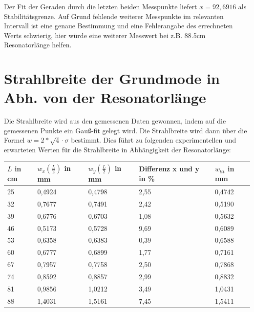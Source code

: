 \documentclass[bigchapter,colorback,accentcolor=tud4b,linedtoc,11pt]{tudreport}
\numberwithin{equation}{subsection}
\begin{document}
Der Fit der Geraden durch die letzten beiden Messpunkte liefert $x=92,6916$ als Stabilitätsgrenze. Auf Grund fehlende weiterer Messpunkte im relevanten Intervall ist eine genaue Bestimmung und eine Fehlerangabe des errechneten Werts schwierig, hier würde eine weiterer Messwert bei z.B. 88.5cm Resonatorlänge helfen.
\section{Strahlbreite der Grundmode in Abh. von der Resonatorlänge}
Die Strahlbreite wird aus den gemessenen Daten gewonnen, indem auf die gemessenen Punkte ein Gauß-fit gelegt wird. Die Strahlbreite wird dann über die Formel
$w=2*\sqrt{4}\cdot\sigma$
bestimmt. Dies führt zu folgenden experimentellen und erwarteten Werten für die Strahlbreite in Abhängigkeit der Resonatorlänge:
\begin{center}
    \begin{tabular}{ | l | l | l | l | p{4cm} |}
    \hline
    $L$ in cm & $w_x\left(\frac{L}{2}\right)$ in mm & $w_y\left(\frac{L}{2}\right)$ in mm & Differenz x und y in \% & $w_{lit}$ in mm \\ \hline
    25 & 0,4924 & 0,4798 & 2,55 & 0,4742 \\ \hline
    32 & 0,7677 & 0,7491 & 2,42 & 0,5190 \\ \hline
    39 & 0,6776 & 0,6703 & 1,08 & 0,5632 \\ \hline
    46 & 0,5173 & 0,5728 & 9,69 & 0,6089 \\ \hline
    53 & 0,6358 & 0,6383 & 0,39 & 0,6588 \\ \hline
    60 & 0,6777 & 0,6899 & 1,77 & 0,7161 \\ \hline
    67 & 0,7957 & 0,7758 & 2,50 & 0,7868 \\ \hline
    74 & 0,8592 & 0,8857 & 2,99 & 0,8832 \\ \hline
    81 & 0,9856 & 1,0212 & 3,49 & 1,0431 \\ \hline
    88 & 1,4031 & 1,5161 & 7,45 & 1,5411 \\ \hline
    \end{tabular}
\end{center}
\end{document}
